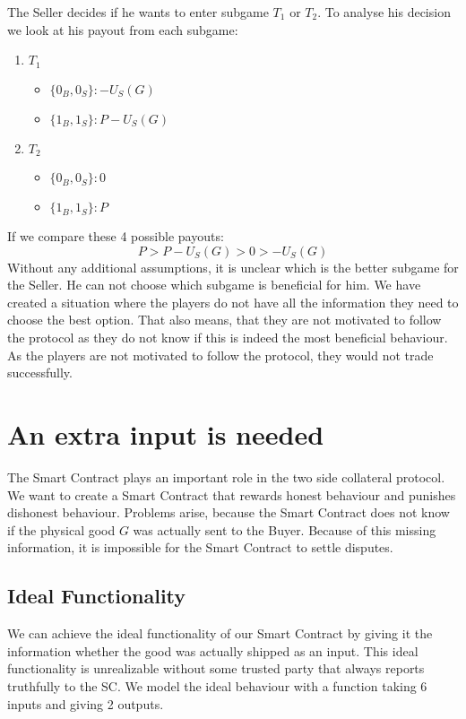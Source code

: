 \documentclass{cacthesis}
\begin{document}
The Seller decides if he wants to enter subgame $T_1$ or $T_2$. To analyse his decision we look at his payout from each subgame:\newline
\begin{enumerate}
    \item $T_1$
        \begin{itemize}
            \item $\{0_B, 0_S\}: -U_S(G)$
            \item $\{1_B, 1_S\}: P-U_S(G)$
        \end{itemize}
    \item $T_2$
        \begin{itemize}
            \item $\{0_B, 0_S\}: 0$
            \item $\{1_B, 1_S\}: P$
        \end{itemize}
\end{enumerate}
If we compare these 4 possible payouts:
\[P > P-U_S(G) > 0 > -U_S(G)\]
Without any additional assumptions, it is unclear which is the better subgame for the Seller. He can not choose which subgame is beneficial for him. 
We have created a situation where the players do not have all the information they need to choose the best option. That also means, that they are not motivated to  follow the protocol as they do not know if this is indeed the most beneficial behaviour. As the players are not motivated to follow the protocol, they would not trade successfully.\newline

\section{An extra input is needed}
\label{sec:extra-input-needed}
The Smart Contract plays an important role in the two side collateral protocol. We want to create a Smart Contract that rewards honest behaviour and punishes dishonest behaviour. 
Problems arise, because the Smart Contract does not know if the physical good $G$ was actually sent to the Buyer. Because of this missing information, it is impossible for the Smart Contract to settle disputes.
\subsection{Ideal Functionality}
We can achieve the ideal functionality of our Smart Contract by giving it the
information whether the good was actually shipped as an input. This ideal functionality is unrealizable without some trusted party that always reports truthfully to the SC. We model the ideal behaviour with a function taking 6 inputs and giving 2 outputs.\newline
\end{document}
